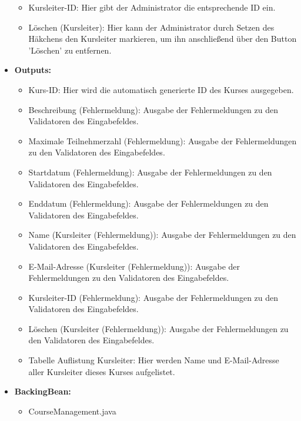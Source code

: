 \begin{itemize}
\begin{itemize}
								\item Kursleiter-ID: Hier gibt der Administrator die entsprechende ID ein.
								\item Löschen (Kursleiter): Hier kann der Administrator durch Setzen des Häkchens den Kursleiter markieren, um ihn anschließend über den Button 'Löschen' zu entfernen.
							\end{itemize}
						\item \textbf{Outputs:}
							\begin{itemize}
								\item Kurs-ID: Hier wird die automatisch generierte ID des Kurses ausgegeben.
								\item Beschreibung (Fehlermeldung): Ausgabe der Fehlermeldungen zu den Validatoren des Eingabefeldes.
								\item Maximale Teilnehmerzahl (Fehlermeldung): Ausgabe der Fehlermeldungen zu den Validatoren des Eingabefeldes.
								\item Startdatum (Fehlermeldung): Ausgabe der Fehlermeldungen zu den Validatoren des Eingabefeldes.
								\item Enddatum (Fehlermeldung): Ausgabe der Fehlermeldungen zu den Validatoren des Eingabefeldes.
								\item Name (Kursleiter (Fehlermeldung)): Ausgabe der Fehlermeldungen zu den Validatoren des Eingabefeldes.
								\item E-Mail-Adresse (Kursleiter (Fehlermeldung)): Ausgabe der Fehlermeldungen zu den Validatoren des Eingabefeldes.
								\item Kursleiter-ID (Fehlermeldung): Ausgabe der Fehlermeldungen zu den Validatoren des Eingabefeldes.
								\item Löschen (Kursleiter (Fehlermeldung)): Ausgabe der Fehlermeldungen zu den Validatoren des Eingabefeldes.
								\item Tabelle Auflistung Kursleiter: Hier werden Name und E-Mail-Adresse aller Kursleiter dieses Kurses aufgelistet.
							\end{itemize}
						\item \textbf{BackingBean:}
							\begin{itemize}
								\item CourseManagement.java
							\end{itemize}
					\end{itemize}
				
